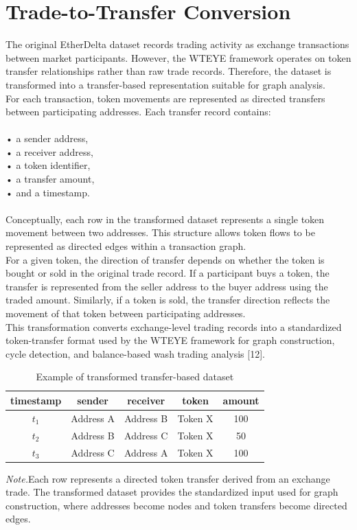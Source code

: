 \documentclass[language=english,thesis=bachelor,nosecondtitle,faculty=cb,onesided,12pt]{hsmw-thesis}
\begin{document}
	\section{Trade-to-Transfer Conversion}
The original EtherDelta dataset records trading activity as exchange transactions between market participants. However, the WTEYE framework operates on token transfer relationships rather than raw trade records. Therefore, the dataset is transformed into a transfer-based representation suitable for graph analysis.\\
For each transaction, token movements are represented as directed transfers between participating addresses. Each transfer record contains:\\
\\
• a sender address,\\
• a receiver address,\\
• a token identifier,\\
• a transfer amount,\\
• and a timestamp.\\
\\
Conceptually, each row in the transformed dataset represents a single token movement between two addresses. This structure allows token flows to be represented as directed edges within a transaction graph.\\
For a given token, the direction of transfer depends on whether the token is bought or sold in the original trade record. If a participant buys a token, the transfer is represented from the seller address to the buyer address using the traded amount. Similarly, if a token is sold, the transfer direction reflects the movement of that token between participating addresses.\\
This transformation converts exchange-level trading records into a standardized token-transfer format used by the WTEYE framework for graph construction, cycle detection, and balance-based wash trading analysis [12].\\

\begin{table}[h!]
\centering
\begin{tabular}{ccccc}
	\hline
	\textbf{timestamp} & \textbf{sender} & \textbf{receiver} & \textbf{token} & \textbf{amount} \\ \hline
	$t_1$ & Address A & Address B & Token X & 100 \\ 
	$t_2$ & Address B & Address C & Token X & 50  \\ 
	$t_3$ & Address C & Address A & Token X & 100 \\ \hline
\end{tabular}
\caption{Example of transformed transfer-based dataset}
\label{table:transformed_dataset}
\end{table}
\textit{Note.}Each row represents a directed token transfer derived from an exchange trade. The transformed dataset provides the standardized input used for graph construction, where addresses become nodes and token transfers become directed edges. 
\end{document}

